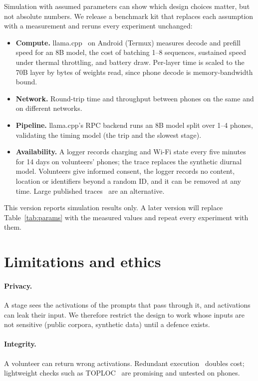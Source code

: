 \documentclass[sigconf,nonacm]{acmart}
\begin{document}
Simulation with assumed parameters can show which design choices matter, but
not absolute numbers. We release a benchmark kit that replaces each assumption
with a measurement and reruns every experiment unchanged:
\begin{itemize}
\item \textbf{Compute.} llama.cpp~\cite{llamacpp} on Android (Termux) measures
decode and prefill speed for an 8B model, the cost of batching 1--8 sequences,
sustained speed under thermal throttling, and battery draw. Per-layer time is
scaled to the 70B layer by bytes of weights read, since phone decode is
memory-bandwidth bound.
\item \textbf{Network.} Round-trip time and throughput between phones on the
same and on different networks.
\item \textbf{Pipeline.} llama.cpp's RPC backend runs an 8B model split over
1--4 phones, validating the timing model (the trip and the slowest stage).
\item \textbf{Availability.} A logger records charging and Wi-Fi state every
five minutes for 14 days on volunteers' phones; the trace replaces the
synthetic diurnal model. Volunteers give
informed consent, the logger records no content, location or identifiers
beyond a random ID, and it can be removed at any time. Large published
traces~\cite{yang2021heterogeneity} are an alternative.
\end{itemize}
This version reports simulation results only. A later version will replace
Table~\ref{tab:params} with the measured values and repeat every experiment
with them.

\section{Limitations and ethics}
\label{sec:limits}

\paragraph{Privacy.} A stage sees the activations of the prompts that pass
through it, and activations can leak their input. We therefore restrict the
design to work whose inputs are not sensitive (public corpora, synthetic data)
until a defence exists.
\paragraph{Integrity.} A volunteer can return wrong activations. Redundant
execution~\cite{boinc} doubles cost; lightweight checks such as
TOPLOC~\cite{toploc} are promising and untested on phones.
\end{document}
